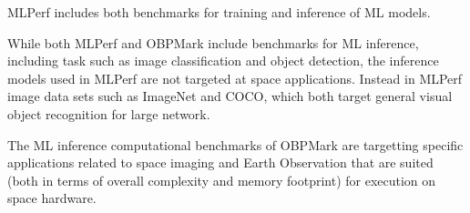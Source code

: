 MLPerf includes both benchmarks for training and inference of ML models.

While both MLPerf and OBPMark include benchmarks for ML inference, including task such as image classification and object detection, the inference models used in MLPerf are not targeted at space applications. Instead in MLPerf image data sets such as ImageNet and COCO, which both target general visual object recognition for large network.

The ML inference computational benchmarks of OBPMark are targetting specific applications related to space imaging and Earth Observation that are suited (both in terms of overall complexity and memory footprint) for execution on space hardware.